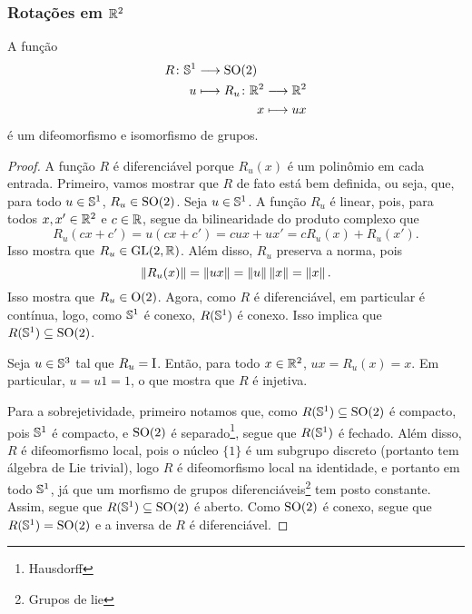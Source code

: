 \subsubsection{Rotações em $\R^2$}

\begin{proposition}
A função
	\begin{align*}
	\func{R}{\S^1}{\SO(2)}{u}{
		\begin{aligned}[t]
			\func{R_u}{\R^2}{\R^2}{x}{ux}
		\end{aligned}
	}
	\end{align*}
é um difeomorfismo e isomorfismo de grupos.
\end{proposition}
\begin{proof}
A função $R$ é diferenciável porque $R_u(x)$ é um polinômio em cada entrada. Primeiro, vamos mostrar que $R$ de fato está bem definida, ou seja, que, para todo $u \in \S^1$, $R_u \in \SO(2)$. Seja $u \in \S^1$. A função $R_u$ é linear, pois, para todos $x,x' \in \R^2$ e $c \in \R$, segue da bilinearidade do produto complexo que
	\begin{equation*}
	R_u(cx+c') = u(cx+c') = cux + ux' = cR_u(x) + R_u(x').
	\end{equation*}
Isso mostra que $R_u \in \GL(2,\R)$. Além disso, $R_u$ preserva a norma, pois
	\begin{equation*}
	\nor{R_u(x)} = \nor{ux} = \nor{u}\nor{x} = \nor{x}.
	\end{equation*}
Isso mostra que $R_u \in \OO(2)$. Agora, como $R$ é diferenciável, em particular é contínua, logo, como $\S^1$ é conexo, $R(\S^1)$ é conexo. Isso implica que $R(\S^1) \subseteq \SO(2)$.

Seja $u \in \S^3$ tal que $R_u = \Id$. Então, para todo $x \in \R^2$, $ux = R_u(x) = x$. Em particular, $u = u1 = 1$, o que mostra que $R$ é injetiva.

Para a sobrejetividade, primeiro notamos que, como $R(\S^1) \subseteq \SO(2)$ é compacto, pois $\S^1$ é compacto, e $\SO(2)$ é separado\footnote{Hausdorff}, segue que $R(\S^1)$ é fechado. Além disso, $R$ é difeomorfismo local, pois o núcleo $\{1\}$ é um subgrupo discreto (portanto tem álgebra de Lie trivial), logo $R$ é difeomorfismo local na identidade, e portanto em todo $\S^1$, já que um morfismo de grupos diferenciáveis\footnote{Grupos de lie} tem posto constante. Assim, segue que $R(\S^1) \subseteq \SO(2)$ é aberto. Como $\SO(2)$ é conexo, segue que $R(\S^1) = \SO(2)$ e a inversa de $R$ é diferenciável.
\end{proof}


